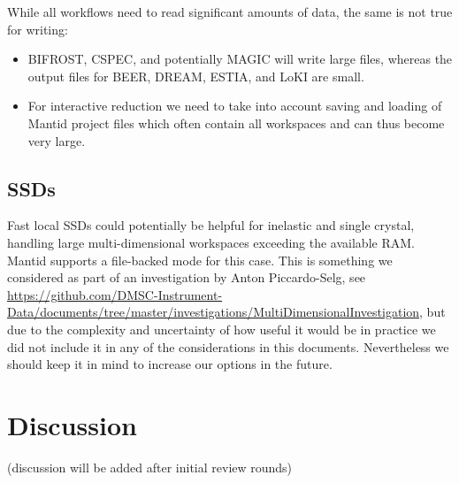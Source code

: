 \documentclass[a4paper,english,numbers=noenddot,bibliography=totoc,chapterprefix=on,DIV=12]{scrartcl}
\newcommand{\beer}{BEER\xspace}
\newcommand{\bifrost}{BIFROST\xspace}
\newcommand{\cspec}{CSPEC\xspace}
\newcommand{\dream}{DREAM\xspace}
\newcommand{\estia}{ESTIA\xspace}
\newcommand{\loki}{LoKI\xspace}
\newcommand{\magic}{MAGIC\xspace}
\newcommand{\mantid}{Mantid\xspace}
\begin{document}
While all workflows need to read significant amounts of data, the same is not true for writing:
\begin{itemize}
  \item \bifrost, \cspec, and potentially \magic will write large files, whereas the output files for \beer, \dream, \estia, and \loki are small.
  \item For interactive reduction we need to take into account saving and loading of \mantid project files which often contain all workspaces and can thus become very large.
\end{itemize}


\subsection{SSDs}

Fast local SSDs could potentially be helpful for inelastic and single crystal, handling large multi-dimensional workspaces exceeding the available RAM.
\mantid supports a file-backed mode for this case.
This is something we considered as part of an investigation by Anton Piccardo-Selg, see \url{https://github.com/DMSC-Instrument-Data/documents/tree/master/investigations/MultiDimensionalInvestigation}, but due to the complexity and uncertainty of how useful it would be in practice we did not include it in any of the considerations in this documents.
Nevertheless we should keep it in mind to increase our options in the future.




\section{Discussion}

(discussion will be added after initial review rounds)
\end{document}
